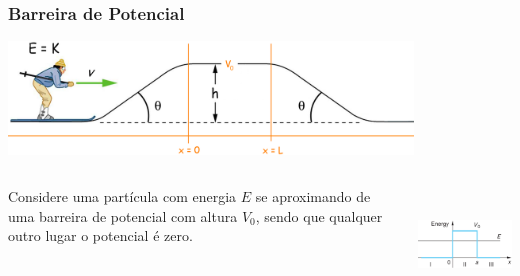 \documentclass[12pt,brazil,table]{beamer}
\begin{document}
\begin{frame}
  \frametitle{Barreira de Potencial}
  
  \fontsize{9pt}{11pt}\selectfont
  
    \begin{minipage}[t][20ex][t]{\linewidth}
      \begin{center}
        \vspace*{-1cm}\includegraphics[height=3cm]{figuras/fig32}
      \end{center}
    \end{minipage}
    
    \vspace*{-1.cm}
    \begin{minipage}[b][20ex][t]{\linewidth}
      \begin{columns}
        \fontsize{9pt}{11pt}\selectfont
        
        \vspace*{1.cm}        
        \begin{minipage}{\linewidth}
           Considere uma partícula com energia $E$ se aproximando de uma barreira de potencial com altura $V_0$, sendo que qualquer outro lugar o potencial é zero.
        \end{minipage}
        
          \begin{center}
            \includegraphics[height=3cm]{figuras/fig33}
          \end{center}
      \end{columns}
    \end{minipage}

\end{frame}

  
\end{document}
